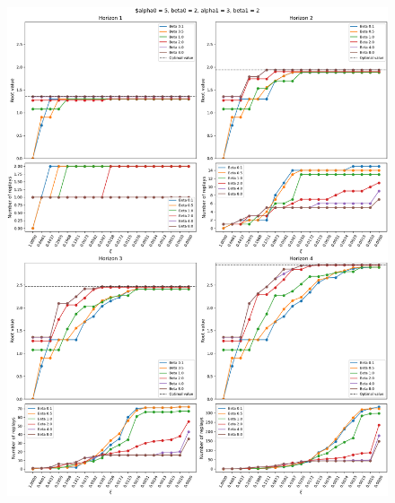 \documentclass{article}
\begin{document}
\begin{figure}[ht!]
    \centering
    \includegraphics[width=1\textwidth]{../../../../bandit/data/convergence/xi/alpha05_beta02_alpha13_beta12_complete.png}
\end{figure}
\end{document}
